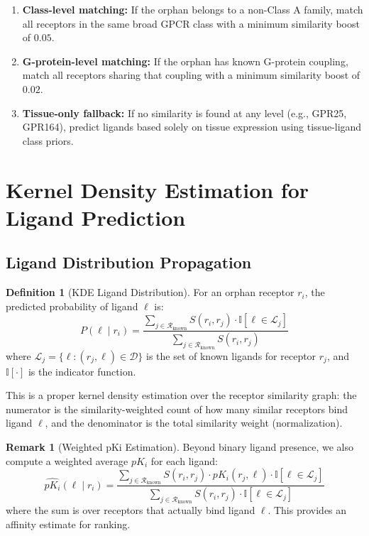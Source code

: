 \documentclass[12pt,oneside]{article}
\theoremstyle{definition}
\newtheorem{definition}{Definition}[section]
\newtheorem{remark}{Remark}[section]
\newcommand{\RR}{\mathcal{R}}
\begin{document}
\begin{enumerate}[label=(B\arabic*)]
\item \textbf{Class-level matching:} If the orphan belongs to a non-Class A family, match all receptors in the same broad GPCR class with a minimum similarity boost of $0.05$.
\item \textbf{G-protein-level matching:} If the orphan has known G-protein coupling, match all receptors sharing that coupling with a minimum similarity boost of $0.02$.
\item \textbf{Tissue-only fallback:} If no similarity is found at any level (e.g., GPR25, GPR164), predict ligands based solely on tissue expression using tissue-ligand class priors.
\end{enumerate}

\section{Kernel Density Estimation for Ligand Prediction}

\subsection{Ligand Distribution Propagation}

\begin{definition}[KDE Ligand Distribution]
For an orphan receptor $r_i$, the predicted probability of ligand $\ell$ is:
\begin{equation}
P(\ell \mid r_i) = \frac{\sum_{j \in \RR_{\text{known}}} S(r_i, r_j) \cdot \mathbb{I}[\ell \in \mathcal{L}_j]}{\sum_{j \in \RR_{\text{known}}} S(r_i, r_j)}
\label{eq:kde_ligand}
\end{equation}
where $\mathcal{L}_j = \{\ell : (r_j, \ell) \in \mathcal{D}\}$ is the set of known ligands for receptor $r_j$, and $\mathbb{I}[\cdot]$ is the indicator function.

This is a proper kernel density estimation over the receptor similarity graph: the numerator is the similarity-weighted count of how many similar receptors bind ligand $\ell$, and the denominator is the total similarity weight (normalization).
\end{definition}

\begin{remark}[Weighted pKi Estimation]
Beyond binary ligand presence, we also compute a weighted average $pK_i$ for each ligand:
\begin{equation}
\widehat{pK_i}(\ell \mid r_i) = \frac{\sum_{j \in \RR_{\text{known}}} S(r_i, r_j) \cdot pK_i(r_j, \ell) \cdot \mathbb{I}[\ell \in \mathcal{L}_j]}{\sum_{j \in \RR_{\text{known}}} S(r_i, r_j) \cdot \mathbb{I}[\ell \in \mathcal{L}_j]}
\label{eq:weighted_pki}
\end{equation}
where the sum is over receptors that actually bind ligand $\ell$. This provides an affinity estimate for ranking.
\end{remark}
\end{document}
